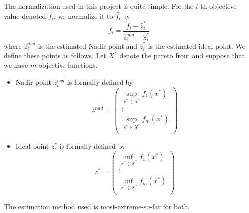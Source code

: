 The normalization used in this project is quite simple. For the \(i\)-th objective value denoted \(f_i\), we normalize it to \(\bar{f_i}\) by
\[
    \bar{f_i} = \frac{f_i - \hat{z}^*_i}{\hat{z}_i^{nad} - \hat{z}_i^*}
\]
where \(\hat{z}_i^{nad}\) is the estimated Nadir point and \(\hat{z}_i^*\) is the estimated ideal point. We define these points as follows. Let \(X^*\) denote the pareto front and suppose that we have \(m\) objective functions.
\begin{itemize}
    \item Nadir point \(z_i^{nad}\) is formally defined by
        \[
            z^{nad} = \begin{pmatrix}
                \sup_{x^* \in X^*} f_1(x^*) \\
                \vdots \\
                \sup_{x^* \in X^*} f_m(x^*) \\
            \end{pmatrix}
        \]
    \item Ideal point \(z_i^*\) is formally defined by
        \[
            z^{*} = \begin{pmatrix}
                \inf_{x^* \in X^*} f_1(x^*) \\
                \vdots \\
                \inf_{x^* \in X^*} f_m(x^*) \\
            \end{pmatrix}
        \]
\end{itemize}
The estimation method used is most-extreme-so-far for both.
